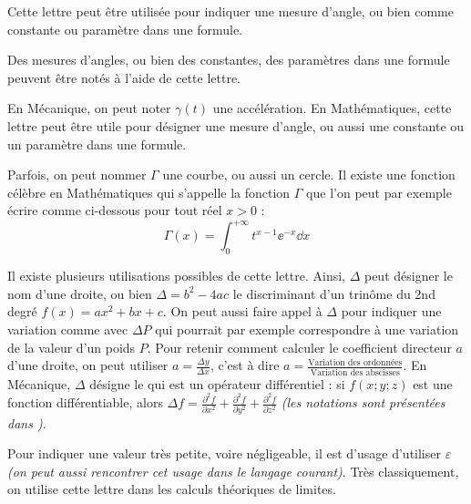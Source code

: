 
\cadre{$\alpha$} Cette lettre peut être utilisée pour indiquer une mesure d'angle, ou bien comme constante ou paramètre dans une formule.


\cadre{$\beta$} Des mesures d'angles, ou bien des constantes, des paramètres dans une formule peuvent être notés à l'aide de cette lettre.


\cadre{$\gamma$} En Mécanique, on peut noter $\gamma(t)$ une accélération. En Mathématiques, cette lettre peut être utile pour désigner une mesure d'angle, ou aussi une constante ou un paramètre dans une formule.


\cadre{$\Gamma$} Parfois, on peut nommer $\Gamma$ une courbe, ou aussi un cercle. Il existe une fonction célèbre en Mathématiques qui s'appelle la fonction $\Gamma$ que l'on peut par exemple écrire comme ci-dessous pour tout réel $x > 0$ :
\begin{equation}
	\Gamma(x) = \int_{0}^{+\infty} t^{x-1} \ee^{-x} \dd x
\end{equation}


\cadre{$\Delta$} Il existe plusieurs utilisations possibles de cette lettre. Ainsi, $\Delta$ peut désigner le nom d'une droite, ou bien $\Delta = b^ 2 - 4 a c$ le discriminant d’un trinôme du 2nd degré $f(x) = a x^2 + b x + c$. On peut aussi faire appel à $\Delta$ pour indiquer une variation comme avec $\Delta P$ qui pourrait par exemple correspondre à une variation de la valeur d'un poids $P$.
Pour retenir comment calculer le coefficient directeur $a$ d'une droite, on peut utiliser $a = \frac{\Delta y}{\Delta x}$, c'est à dire $a = \frac{ \text{Variation des ordonnées} }{ \text{Variation des abscisses} }$.
En Mécanique, $\Delta$ désigne le  qui est un opérateur différentiel : si $f(x;y;z)$ est une fonction différentiable, alors $\Delta f =\frac{\partial^{2} f}{\partial x^{2}} + \frac{\partial^{2} f}{\partial y^{2}} + \frac{\partial^{2} f}{\partial z^{2}}$ \emph{(les notations sont présentées dans  \pageref{partialDer})}.


\cadre{$\varepsilon$} Pour indiquer une valeur très petite, voire négligeable, il est d'usage d'utiliser $\varepsilon$ \emph{(on peut aussi rencontrer cet usage dans le langage courant)}. Très classiquement, on utilise cette lettre dans les calculs théoriques de limites.


